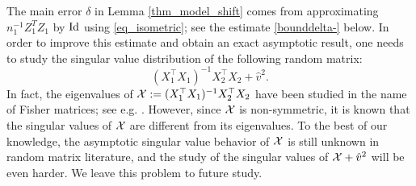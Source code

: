 The main error $\delta$ in Lemma \ref{thm_model_shift} comes from approximating $n_1^{-1}Z_1^TZ_1$ by $\id$ using \eqref{eq_isometric}; see the estimate \eqref{bounddelta-} below. In order to improve this estimate and obtain an exact asymptotic result, one needs to study the singular value distribution of the following random matrix:
$$(X_1^{\top}X_1)^{-1}X_2^{\top}X_2 +  \hat{v}^2 .$$
In fact, the eigenvalues of $\cal X:=(X_1^{\top}X_1)^{-1}X_2^{\top}X_2$ have been studied in the name of Fisher matrices; see e.g. \cite{Fmatrix}. However, since $\cal X$ is non-symmetric, it is known that the singular values of $\cal X$ are different from its eigenvalues. To the best of our knowledge, the asymptotic singular value behavior of $\cal X$ is still unknown in random matrix literature, and the study of the singular values of $\cal X +\hat v^2$ will be even harder. We leave this problem to future study.





